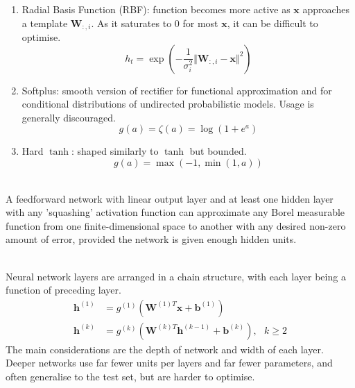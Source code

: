 \begin{definition}
\begin{enumerate}[label=\roman*.]
\item Radial Basis Function (RBF): function becomes more active as $\bm{x}$ approaches a template $\bm{W}_{:, i}$. As it saturates to $0$ for most $\bm{x}$, it can be difficult to optimise.
\begin{equation}
h_t = \exp \left( - \frac{1}{\sigma^2_i} \Vert \bm{W}_{:, i} - \bm{x} \Vert^2 \right) \nonumber
\end{equation}
\item Softplus: smooth version of rectifier for functional approximation and for conditional distributions of undirected probabilistic models. Usage is generally discouraged.
\begin{equation}
g(a) = \zeta(a) = \log(1 + e^a) \nonumber
\end{equation}
\item Hard $\tanh$: shaped similarly to $\tanh$ but bounded.
\begin{equation}
g(a) = \max(-1, \min(1,a)) \nonumber
\end{equation}
\end{enumerate}
\end{definition}

\begin{theorem} \\
A feedforward network with linear output layer and at least one hidden layer with any 'squashing' activation function can approximate any Borel measurable function from one finite-dimensional space to another with any desired non-zero amount of error, provided the network is given enough hidden units.
\end{theorem}

\begin{method} \\
Neural network layers are arranged in a chain structure, with each layer being a function of preceding layer.
\begin{align}
\bm{h}^{(1)} &= g^{(1)} (\bm{W}^{(1)T} \bm{x} + \bm{b}^{(1)}) \nonumber \\
\bm{h}^{(k)} &= g^{(k)} (\bm{W}^{(k)T} \bm{h}^{(k-1)} + \bm{b}^{(k)}), \ \ \ k \geq 2 \nonumber
\end{align}
The main considerations are the depth of network and width of each layer. Deeper networks use far fewer units per layers and far fewer parameters, and often generalise to the test set, but are harder to optimise.
\end{method}


